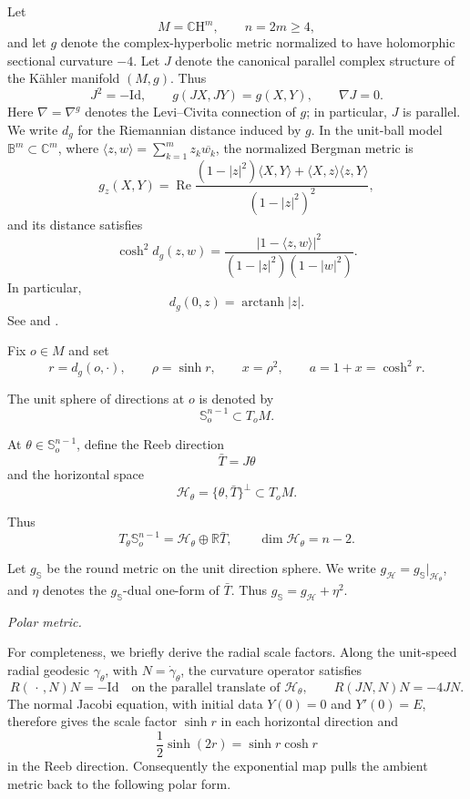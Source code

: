 \documentclass[11pt,reqno]{amsart}
\numberwithin{equation}{section}
\theoremstyle{definition}
\theoremstyle{remark}
\newcommand{\CH}{\mathbb{C}\mathrm{H}}
\newcommand{\sphere}{\mathbb S_o^{n-1}}
\newcommand{\distg}{d_g}
\newcommand{\Id}{\mathrm{Id}}
\newcommand{\ithead}[1]{%
  \par\medskip\noindent\textit{#1}\enspace
}
\begin{document}
Let
\[
M=\CH^m,
\qquad
n=2m\ge4,
\]
and let \(g\) denote the complex-hyperbolic metric normalized to have
holomorphic sectional curvature \(-4\).  Let \(J\) denote the canonical
parallel complex structure of the K\"ahler manifold \((M,g)\).  Thus
\[
J^2=-\Id,
\qquad
g(JX,JY)=g(X,Y),
\qquad
\nabla J=0.
\] Here \(\nabla=\nabla^g\) denotes the Levi--Civita connection of \(g\); in particular,
\(J\) is parallel.
We write \(\distg\) for the Riemannian distance induced by \(g\).  In the
unit-ball model \(\mathbb B^m\subset\mathbb C^m\), where
\(\langle z,w\rangle=\sum_{k=1}^m z_k\overline{w_k}\), the normalized
Bergman metric is
\begin{equation}
g_z(X,Y)
=
\operatorname{Re}
\frac{
(1-|z|^2)\langle X,Y\rangle
+\langle X,z\rangle\langle z,Y\rangle
}{(1-|z|^2)^2},
\label{eq:normalized-Bergman-metric}
\end{equation}
and its distance satisfies
\[
\cosh^2\!\distg(z,w)
=
\frac{|1-\langle z,w\rangle|^2}{(1-|z|^2)(1-|w|^2)}.
\]
In particular,
\[
\distg(0,z)=\operatorname{arctanh}|z|.
\]
See \cite[Chapter~1]{Zhu2005} and \cite{Goldman1999}.

Fix \(o\in M\) and set
\[
r=\distg(o,\cdot),
\qquad
\rho=\sinh r,
\qquad
x=\rho^2,
\qquad
a=1+x=\cosh^2r.
\]

The unit sphere of directions at \(o\) is denoted by
\[
\sphere\subset T_oM.
\]

At \(\theta\in\sphere\), define the Reeb direction
\[
\bar T=J\theta
\]
and the horizontal space
\[
\mathcal H_\theta
=
\{\theta,\bar T\}^{\perp}
\subset T_oM.
\]

Thus
\[
T_\theta\sphere
=
\mathcal H_\theta\oplus\mathbb R\bar T,
\qquad
\dim \mathcal H_\theta=n-2.
\]

Let \(g_{\mathbb S}\) be the round metric on the unit direction sphere.
We write \(g_{\mathcal H}=g_{\mathbb S}|_{\mathcal H_\theta}\), and \(\eta\) denotes the
\(g_{\mathbb S}\)-dual one-form of \(\bar T\). Thus
\(g_{\mathbb S}=g_{\mathcal H}+\eta^2\).

\ithead{Polar metric.}

For completeness, we briefly derive the radial scale factors. Along the
unit-speed radial geodesic \(\gamma_\theta\), with
\(N=\dot\gamma_\theta\), the curvature operator satisfies
\[
R(\,\cdot\,,N)N=-\Id
\quad\text{on the parallel translate of }\mathcal H_\theta,
\qquad
R(JN,N)N=-4JN.
\]
The normal Jacobi equation, with initial data \(Y(0)=0\) and
\(Y'(0)=E\), therefore gives the scale factor \(\sinh r\) in each
horizontal direction and
\[
\frac{1}{2}\sinh(2r)=\sinh r\cosh r
\]
in the Reeb direction. Consequently the exponential map pulls the ambient
metric back to the following polar form.
\end{document}
